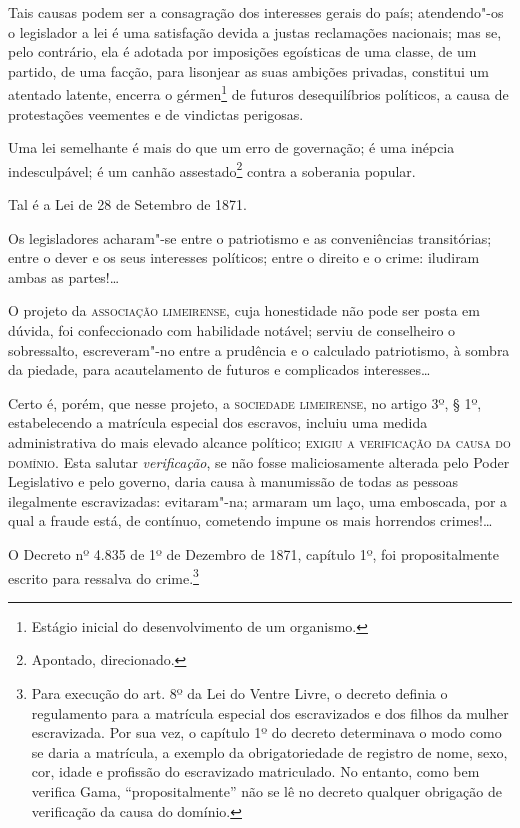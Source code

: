 
Tais causas podem ser a consagração dos interesses gerais do país;
atendendo"-os o legislador a lei é uma satisfação devida a justas
reclamações nacionais; mas se, pelo contrário, ela é adotada por
imposições egoísticas de uma classe, de um partido, de uma facção, para
lisonjear as suas ambições privadas, constitui um atentado latente,
encerra o gérmen\footnote{Estágio inicial do desenvolvimento de um
  organismo.} de futuros desequilíbrios políticos, a causa de
protestações veementes e de vindictas perigosas.

Uma lei semelhante é mais do que um erro de governação; é uma inépcia
indesculpável; é um canhão assestado\footnote{Apontado, direcionado.}
contra a soberania popular.

Tal é a Lei de 28 de Setembro de 1871.

Os legisladores acharam"-se entre o patriotismo e as conveniências
transitórias; entre o dever e os seus interesses políticos; entre o
direito e o crime: iludiram ambas as partes!\ldots{}

O projeto da \textsc{associação limeirense}, cuja honestidade não pode ser posta
em dúvida, foi confeccionado com habilidade notável; serviu de
conselheiro o sobressalto, escreveram"-no entre a prudência e o calculado
patriotismo, à sombra da piedade, para acautelamento de futuros e
complicados interesses\ldots{}

Certo é, porém, que nesse projeto, a \textsc{sociedade limeirense}, no artigo 3º,
§ 1º, estabelecendo a matrícula especial dos escravos, incluiu uma
medida administrativa do mais elevado alcance político; \textsc{exigiu a
verificação da causa do domínio}. Esta salutar \emph{verificação}, se não
fosse maliciosamente alterada pelo Poder Legislativo e pelo governo,
daria causa à manumissão de todas as pessoas ilegalmente escravizadas:
evitaram"-na; armaram um laço, uma emboscada, por a qual a fraude está,
de contínuo, cometendo impune os mais horrendos crimes!\ldots{}

O Decreto nº 4.835 de 1º de Dezembro de 1871, capítulo 1º, foi
propositalmente escrito para ressalva do crime.\footnote{Para execução
  do art. 8º da Lei do Ventre Livre, o decreto definia o regulamento
  para a matrícula especial dos escravizados e dos filhos da mulher
  escravizada. Por sua vez, o capítulo 1º do decreto determinava o modo
  como se daria a matrícula, a exemplo da obrigatoriedade de registro de
  nome, sexo, cor, idade e profissão do escravizado matriculado. No
  entanto, como bem verifica Gama, ``propositalmente'' não se lê no
  decreto qualquer obrigação de verificação da causa do domínio.}


